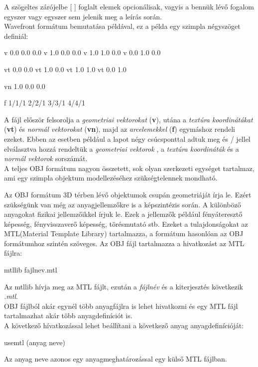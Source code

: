 \noindent A szögeltes zárójelbe [  ] foglalt elemek opcionálisak, vagyis a bennük lévő fogalom egyszer vagy egyszer sem jelenik meg a leírás során. \\

Wavefront formátum bemutatása példával, ez a példa egy szimpla négyszöget definiál:
\begin{python} 
v 0.0 0.0 0.0
v 1.0 0.0 0.0
v 1.0 1.0 0.0
v 0.0 1.0 0.0

vt 0.0 0.0
vt 1.0 0.0
vt 1.0 1.0
vt 0.0 1.0

vn 1.0 0.0 0.0 

f 1/1/1 2/2/1 3/3/1 4/4/1
\end{python}
\bigskip
A fájl először felsorolja a \textsl{geometriai vektorokat} (\textbf{v}), utána a \textsl{textúra koordinátákat} (\textbf{vt}) és \textsl{normál vektorokat} (\textbf{vn}), majd az \textsl{arcelemekkel} (\textbf{f}) egymáshoz rendeli ezeket. Ebben az esetben például a lapot négy csúcsponttal adtuk meg és {/} jellel elválasztva hozzá rendeltük a  \textsl{geometriai vektorok} , a \textsl{textúra koordináták} és a \textsl{normál vektorok} sorszámát.\\

A teljes OBJ formátum nagyon összetett, sok olyan szerkezeti egységet tartalmaz, ami egy szimpla objektum modellezéséhez szükségtelennek mondható.


Az OBJ formátum 3D térben lévő objektumok csupán geometriáját írja le. Ezért szükségünk van még az anyagjellemzőkre is a képszintézis során. A különböző anyagokat fizikai jellemzőikkel írjuk le. Ezek a jellemzők például fényáteresztő képesség, fényvisszaverő képesség, törésmutató stb.\cite{diane1995mtl}\newpage
Ezeket a tulajdonságokat az {MTL}(Material Template Library) tartalmazza, a formátum hasonlóan az OBJ formátumhoz szintén szöveges. Az OBJ fájl tartalmazza a hivatkozást az {MTL} fájlra:
\begin{python}
mtllib fajlnev.mtl
\end{python}
\bigskip
Az mtllib hívja meg az MTL fájlt, ezután a \textsl{fájlnév} és a kiterjesztés következik \textsl{.mtl}.\\
OBJ fájlból akár egynél több anyagfájlra is lehet hivatkozni és egy MTL fájl tartalmazhat akár több anyagdefiníciót is.\\

A következő hívatkozással lehet beállítani a következő anyag anyagdefinícióját:
\begin{python}
usemtl (anyag neve)
\end{python}
\bigskip
Az anyag neve azonos egy anyagmeghatározással egy külső MTL fájlban.\\

